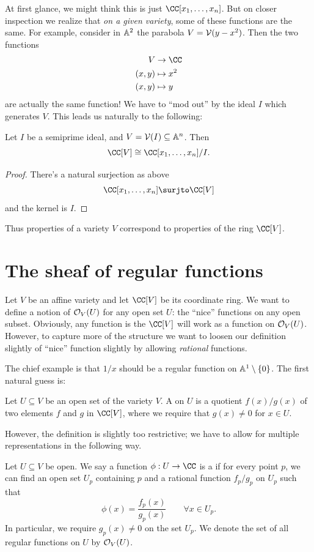 \documentclass[11pt]{scrreprt}
\begin{document}
At first glance, we might think this is just $\CC[x_1, \dots, x_n]$.
But on closer inspection we realize that \emph{on a given variety},
some of these functions are the same.
For example, consider in $\mathbb A^2$ the parabola $V = \mathcal V(y-x^2)$.
Then the two functions
\begin{align*}
	V & \to \CC \\
	(x,y) & \mapsto x^2 \\
	(x,y) & \mapsto y
\end{align*}
are actually the same function!
We have to ``mod out'' by the ideal $I$ which generates $V$.
This leads us naturally to the following:
\begin{theorem}
	Let $I$ be a semiprime ideal, and $V = \mathcal V(I) \subseteq \mathbb A^n$.
	Then \[ \CC[V] \cong \CC[x_1, \dots, x_n] / I.  \]
\end{theorem}
\begin{proof}
	There's a natural surjection as above
	\[ \CC[x_1, \dots, x_n] \surjto \CC[V] \]
	and the kernel is $I$.
\end{proof}
Thus properties of a variety $V$ correspond to properties of the ring $\CC[V]$.

\section{The sheaf of regular functions}

Let $V$ be an affine variety and let $\CC[V]$ be its coordinate ring.
We want to define a notion of $\mathcal O_V(U)$ for any open set $U$:
the ``nice'' functions on any open subset.
Obviously, any function is the $\CC[V]$ will work as a function on $\mathcal O_V(U)$.
However, to capture more of the structure we want to
loosen our definition slightly of ``nice'' function slightly
by allowing \emph{rational} functions.

The chief example is that $1/x$ should be a regular function
on $\mathbb A^1 \setminus \{0\}$.
The first natural guess is:
\begin{definition}
	Let $U \subseteq V$ be an open set of the variety $V$.
	A  on $U$
	is a quotient $f(x) / g(x)$ of two elements $f$ and $g$ in $\CC[V]$,
	where we require that $g(x) \neq 0$ for $x \in U$.
\end{definition}
However, the definition is slightly too restrictive;
we have to allow for multiple representations in the following way.
\begin{definition}
	Let $U \subseteq V$ be open.
	We say a function $\phi : U \to \CC$ is a  if
	for every point $p$, we can find an open set $U_p$ containing $p$
	and a rational function $f_p/g_p$ on $U_p$ such that
	\[ \phi(x) = \frac{f_p(x)}{g_p(x)} \qquad \forall x \in U_p. \]
	In particular, we require $g_p(x) \neq 0$ on the set $U_p$.
	We denote the set of all regular functions on $U$ by $\mathcal O_V(U)$.
\end{definition}
\end{document}
